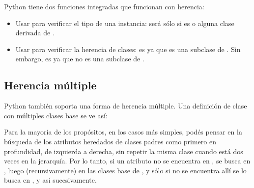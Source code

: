 \documentclass[a5paper,10pt,spanish]{sphinxmanual}
\begin{document}
\sphinxAtStartPar
Python tiene dos funciones integradas que funcionan con herencia:
\begin{itemize}
\item {} 
\sphinxAtStartPar
Usar  para verificar el tipo de una instancia:  será  sólo si  es  o alguna clase derivada de .

\item {} 
\sphinxAtStartPar
Usar  para verificar la herencia de clases:  es  ya que  es una subclase de . Sin embargo,  es  ya que  no es una subclase de .

\end{itemize}


\subsection{Herencia múltiple}
\label{\detokenize{tutorial/classes:multiple-inheritance}}\label{\detokenize{tutorial/classes:tut-multiple}}
\sphinxAtStartPar
Python también soporta una forma de herencia múltiple.  Una definición de clase con múltiples clases base se ve así:

\begin{sphinxVerbatim}[commandchars=\\\{\}]
   
\end{sphinxVerbatim}

\sphinxAtStartPar
Para la mayoría de los propósitos, en los casos más simples, podés pensar en la búsqueda de los atributos heredados de clases padres como primero en profundidad, de izquierda a derecha, sin repetir la misma clase cuando está dos veces en la jerarquía.  Por lo tanto, si un atributo no se encuentra en , se busca en , luego (recursivamente) en las clases base de , y sólo si no se encuentra allí se lo busca en , y así sucesivamente.
\end{document}
